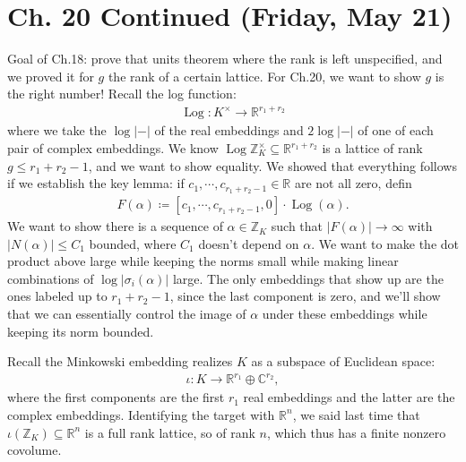 \hypertarget{ch.-20-continued-friday-may-21}{%
\section{Ch. 20 Continued (Friday, May
21)}\label{ch.-20-continued-friday-may-21}}

\begin{remark}

Goal of Ch.18: prove that units theorem where the rank is left
unspecified, and we proved it for \(g\) the rank of a certain lattice.
For Ch.20, we want to show \(g\) is the right number! Recall the log
function:
\begin{align*}
\operatorname{Log}: K^{\times}\to {\mathbb{R}}^{r_1 + r_2}
\end{align*}
where we take the \(\log{\left\lvert {{-}} \right\rvert}\) of the real
embeddings and \(2\log{\left\lvert {{-}} \right\rvert}\) of one of each
pair of complex embeddings. We know
\(\operatorname{Log}{\mathbb{Z}}_K^{\times}\subseteq {\mathbb{R}}^{r_1 + r_2}\)
is a lattice of rank \(g \leq r_1 + r_2 - 1\), and we want to show
equality. We showed that everything follows if we establish the key
lemma: if \(c_1, \cdots, c_{r_1 + r_2 - 1} \in {\mathbb{R}}\) are not
all zero, defin
\begin{align*}
F(\alpha) \coloneqq{\left[ {c_1, \cdots, c_{r_1 + r_2 - 1}, 0} \right]} \cdot \operatorname{Log}(\alpha)
.\end{align*}
We want to show there is a sequence of \(\alpha\in {\mathbb{Z}}_K\) such
that \({\left\lvert {F(\alpha)} \right\rvert} \to \infty\) with
\({\left\lvert {N( \alpha)} \right\rvert} \leq C_1\) bounded, where
\(C_1\) doesn't depend on \(\alpha\). We want to make the dot product
above large while keeping the norms small while making linear
combinations of \(\log{\left\lvert {\sigma_i( \alpha)} \right\rvert}\)
large. The only embeddings that show up are the ones labeled up to
\(r_1 + r_2 - 1\), since the last component is zero, and we'll show that
we can essentially control the image of \(\alpha\) under these
embeddings while keeping its norm bounded.

Recall the Minkowski embedding realizes \(K\) as a subspace of Euclidean
space:
\begin{align*}
\iota: K\to {\mathbb{R}}^{r_1} \oplus {\mathbb{C}}^{r_2}
,\end{align*}
where the first components are the first \(r_1\) real embeddings and the
latter are the complex embeddings. Identifying the target with
\({\mathbb{R}}^n\), we said last time that
\(\iota({\mathbb{Z}}_K) \subseteq {\mathbb{R}}^n\) is a full rank
lattice, so of rank \(n\), which thus has a finite nonzero covolume.


\end{remark}
